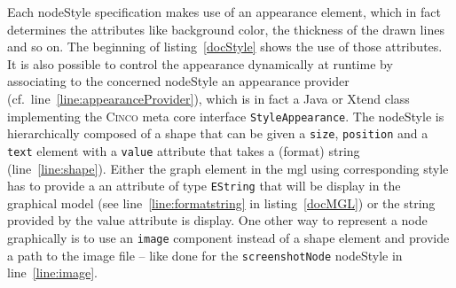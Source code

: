 Each nodeStyle specification makes use of an appearance element, which in fact determines the attributes like background color, the thickness of the drawn lines and so on. The beginning of listing~\ref{docStyle} shows the use of those attributes. It is also possible to control the appearance dynamically at runtime by associating to the concerned nodeStyle an appearance provider (cf.\ line~\ref{line:appearanceProvider}), which is in fact a Java or Xtend class implementing the \textsc{Cinco} meta core interface \lstinline{StyleAppearance}. The nodeStyle is hierarchically composed of a shape that can be given a \lstinline[language=MGL]{size}, \lstinline[language=MGL]{position} and a \lstinline[language=MGL]{text} element with a \lstinline[language=MGL]{value} attribute that takes a (format) string (line~\ref{line:shape}). Either the graph element in the \acrshort{mgl} using corresponding style has to provide a an attribute of type \lstinline{EString} that will be display in the graphical model (see line~\ref{line:formatstring} in listing~\ref{docMGL}) or the string provided by the value attribute is display. One other way to represent a node graphically is to use an \lstinline[language=MGL]{image} component instead of a shape element and provide a path to the image file -- like done for the \lstinline{screenshotNode} nodeStyle in line~\ref{line:image}.

